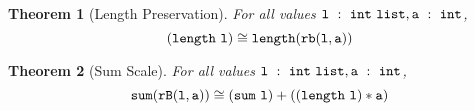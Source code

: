 \documentclass[11pt]{article}
\newtheorem{theorem}{Theorem}
\begin{document}
\begin{theorem}[Length Preservation]
\label{thrm:length}
For all values $\mathtt{{l}}\ :\ {{\mathtt{int}}~\mathtt{list}},
\mathtt{{a}}\ :\ {\mathtt{int}}$, $${\mathtt{({length}~{l})}} \cong {\mathtt{length(rb(l,a))}}$$
\end{theorem}

\begin{theorem}[Sum Scale]
\label{thrm:scale}
For all values $\mathtt{{l}}\ :\ {{\mathtt{int}}~\mathtt{list}},
\mathtt{{a}}\ :\ {\mathtt{int}}$, $${\mathtt{sum(rB(l,a))}} \cong {\mathtt{({sum}~{l}) +
    (({length}~{\mathtt{l}}) * a)}}$$
\end{theorem}
\end{document}
